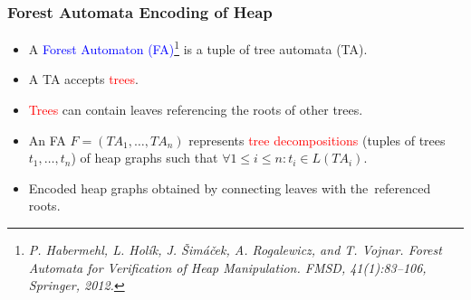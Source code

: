 \documentclass{beamer}
\newenvironment{figure*}%
{\begin{figure}}
{\end{figure}}
\newcommand{\hlbl}[1]{\textcolor{blue}{#1}}
\newcommand{\hlgr}[1]{\textcolor{olive!50!green}{#1}}
\newcommand{\hlrd}[1]{\textcolor{red}{#1}}
\newcommand{\hlye}[1]{\textcolor{magenta}{#1}}
\begin{document}
 \begin{frame}
 \frametitle{Forest Automata Encoding of Heap}
 
 	\begin{itemize}
 			\item A \hlbl{Forest Automaton (FA)}\footnote{\tiny{\textit{P. Habermehl, L. Holík, J. Šimáček, A. Rogalewicz, and T. Vojnar. Forest Automata for Verification of Heap Manipulation. FMSD, 41(1):83--106, Springer, 2012.}}}
				is a tuple of \hlgr{tree automata (TA)}.
 				\pause
 			\item A \hlgr{TA} accepts \hlrd{trees}.
 				\pause
 			\item \hlrd{Trees} can contain leaves referencing the roots of other trees.
 				\pause
 			\item An FA $F=(TA_1,\ldots,TA_n)$ represents \hlrd{tree decompositions} (tuples of trees $t_1,\ldots,t_n$) of heap graphs
 				such that $\forall 1 \leq i \leq n: t_i \in L(TA_i)$.
 				\pause
 			\item Encoded heap graphs obtained by connecting leaves with the~referenced roots.
 	\end{itemize}
 
 	\begin{center}
 	\begin{figure}
 		\begin{subfigure}{0.5\textwidth}
 			\centering
 			
 		\end{subfigure}%
 		\hspace{-0.3cm}
 		\begin{subfigure}{0.5\textwidth}
 			\centering
 			
 		\end{subfigure}
 	\end{figure}
 	\end{center}
 
 \end{frame}
 
\end{document}
